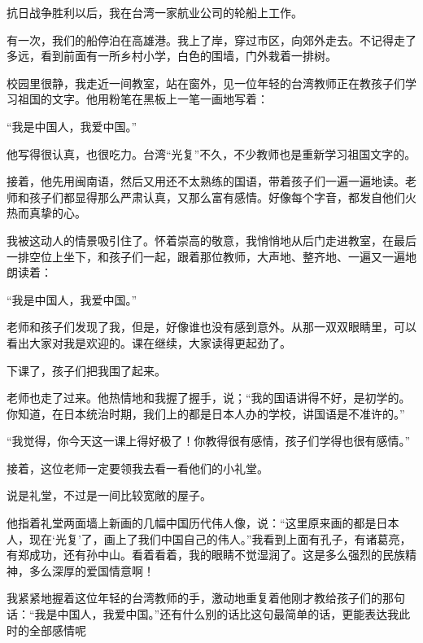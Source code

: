 \documentclass[12pt,UTF-8,openany]{ctexbook}
\begin{document}
\begin{large}
    
    抗日战争胜利以后，我在台湾一家航业公司的轮船上工作。
    
    有一次，我们的船停泊在高雄港。我上了岸，穿过市区，向郊外走去。不记得走了多远，看到前面有一所乡村小学，白色的围墙，门外栽着一排树。
    
    校园里很静，我走近一间教室，站在窗外，见一位年轻的台湾教师正在教孩子们学习祖国的文字。他用粉笔在黑板上一笔一画地写着：
    
    “我是中国人，我爱中国。”
    
    他写得很认真，也很吃力。台湾“光复”不久，不少教师也是重新学习祖国文字的。
    
    接着，他先用闽南语，然后又用还不太熟练的国语，带着孩子们一遍一遍地读。老师和孩子们都显得那么严肃认真，又那么富有感情。好像每个字音，都发自他们火热而真挚的心。
    
    我被这动人的情景吸引住了。怀着崇高的敬意，我悄悄地从后门走进教室，在最后一排空位上坐下，和孩子们一起，跟着那位教师，大声地、整齐地、一遍又一遍地朗读着：
    
    “我是中国人，我爱中国。”
    
    老师和孩子们发现了我，但是，好像谁也没有感到意外。从那一双双眼睛里，可以看出大家对我是欢迎的。课在继续，大家读得更起劲了。
    
    下课了，孩子们把我围了起来。
    
    老师也走了过来。他热情地和我握了握手，说；“我的国语讲得不好，是初学的。你知道，在日本统治时期，我们上的都是日本人办的学校，讲国语是不准许的。”
    
    “我觉得，你今天这一课上得好极了！你教得很有感情，孩子们学得也很有感情。”
    
    接着，这位老师一定要领我去看一看他们的小礼堂。
    
    说是礼堂，不过是一间比较宽敞的屋子。
    
    他指着礼堂两面墙上新画的几幅中国历代伟人像，说：“这里原来画的都是日本人，现在‘光复’了，画上了我们中国自己的伟人。”我看到上面有孔子，有诸葛亮，有郑成功，还有孙中山。看着看着，我的眼睛不觉湿润了。这是多么强烈的民族精神，多么深厚的爱国情意啊！
    
    我紧紧地握着这位年轻的台湾教师的手，激动地重复着他刚才教给孩子们的那句话：“我是中国人，我爱中国。”还有什么别的话比这句最简单的话，更能表达我此时的全部感情呢
    
\end{large}
\end{document}
